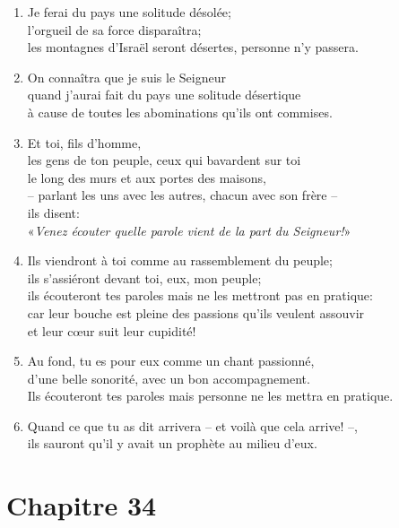 \begin{enumerate}[leftmargin=\psleftmargin, labelsep = \pslabelsep, label={\arabic*}, font=\color{\pscolor}\small\textsuperscript, parsep=0em, itemsep=0em, topsep=0em ]
    \item Je ferai du pays une solitude désolée; \\ l’orgueil de sa force disparaîtra; \\ les montagnes d’Israël seront désertes, personne n’y passera.
    \item On connaîtra que je suis le Seigneur \\ quand j’aurai fait du pays une solitude désertique \\ à cause de toutes les abominations qu’ils ont commises. \parSpace
    \item Et toi, fils d’homme, \\ les gens de ton peuple, ceux qui bavardent sur toi \\ le long des murs et aux portes des maisons, \\– parlant les uns avec les autres, chacun avec son frère – \\ ils disent: \\ \decalage «\textit{Venez écouter quelle parole vient de la part du Seigneur!}» 
    \item Ils viendront à toi comme au rassemblement du peuple; \\ ils s’assiéront devant toi, eux, mon peuple; \\ ils écouteront tes paroles mais ne les mettront pas en pratique: \\ car leur bouche est pleine des passions qu’ils veulent assouvir \\ et leur cœur suit leur cupidité!
    \item Au fond, tu es pour eux comme un chant passionné, \\ d’une belle sonorité, avec un bon accompagnement. \\ Ils écouteront tes paroles mais personne ne les mettra en pratique. \verseSpace
    \item Quand ce que tu as dit arrivera – et voilà que cela arrive! –,\\ ils sauront qu’il y avait un prophète au milieu d’eux.
\end{enumerate}
\newpage

\section*{Chapitre 34}
